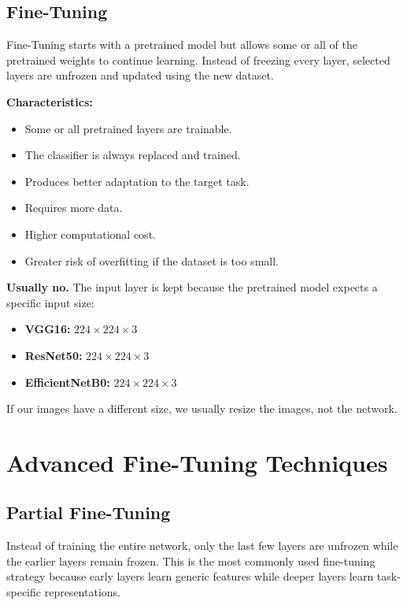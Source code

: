 \subsection{Fine-Tuning}
Fine-Tuning starts with a pretrained model but allows some or all of the pretrained weights to continue learning. Instead of freezing every layer, selected layers are unfrozen and updated using the new dataset.

\textbf{Characteristics:}
\begin{itemize}
    \item Some or all pretrained layers are trainable.
    \item The classifier is always replaced and trained.
    \item Produces better adaptation to the target task.
    \item Requires more data.
    \item Higher computational cost.
    \item Greater risk of overfitting if the dataset is too small.
\end{itemize}

\begin{propertybox}
\textbf{Usually no.} The input layer is kept because the pretrained model expects a specific input size:
\begin{itemize}
    \item \textbf{VGG16:} $224 \times 224 \times 3$
    \item \textbf{ResNet50:} $224 \times 224 \times 3$
    \item \textbf{EfficientNetB0:} $224 \times 224 \times 3$
\end{itemize}
If our images have a different size, we usually resize the images, not the network.
\end{propertybox}

\section{Advanced Fine-Tuning Techniques}

\subsection{Partial Fine-Tuning}
Instead of training the entire network, only the last few layers are unfrozen while the earlier layers remain frozen. This is the most commonly used fine-tuning strategy because early layers learn generic features while deeper layers learn task-specific representations.

